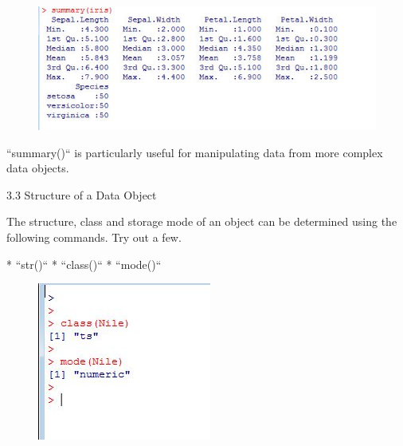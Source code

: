 \documentclass{beamer}
\begin{document}



\begin{figure}
\centering
\includegraphics[width=0.99\linewidth]{images/irissummary}

\end{figure}
``summary()`` is particularly useful for manipulating data from more complex data objects.




{3.3 Structure of a Data Object}

The structure, class and storage mode of an object can be determined using the following
commands. Try out a few.

*  ``str()``
*  ``class()``
*  ``mode()``





\begin{figure}
\centering
\includegraphics[width=0.7\linewidth]{images/classnile}
\end{figure}



\end{document}
